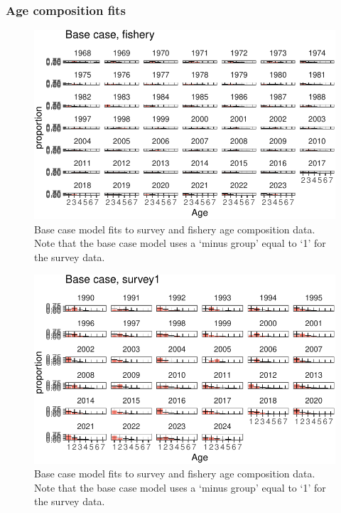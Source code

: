 \documentclass[
  letterpaper,
  DIV=11,
  numbers=noendperiod]{scrartcl}
\begin{document}
\subsubsection{Age composition fits}\label{age-composition-fits}

\begin{figure}[H]

{\centering \includegraphics{00-Namibian_hake_model_2024_files/figure-pdf/agecomps-1.pdf}

}

\caption{Base case model fits to survey and fishery age composition
data. Note that the base case model uses a `minus group' equal to `1'
for the survey data.}

\end{figure}%

\begin{figure}[H]

{\centering \includegraphics{00-Namibian_hake_model_2024_files/figure-pdf/agecomps-2.pdf}

}

\caption{Base case model fits to survey and fishery age composition
data. Note that the base case model uses a `minus group' equal to `1'
for the survey data.}

\end{figure}%
\end{document}
